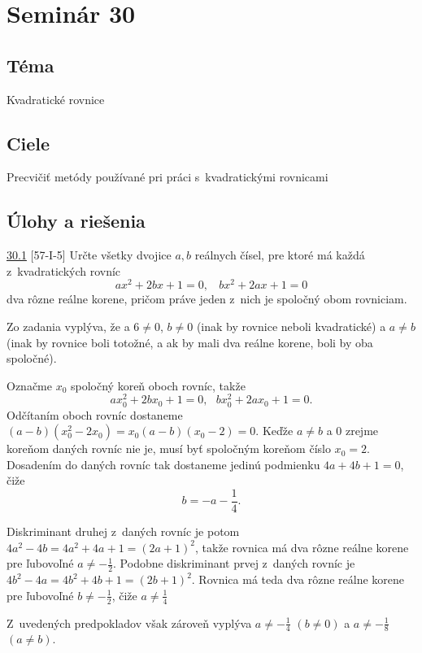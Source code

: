 \section*{Seminár 30}
\subsection*{Téma}
Kvadratické rovnice

\subsection*{Ciele}
Precvičiť metódy používané pri práci s~kvadratickými rovnicami

\subsection*{Úlohy a riešenia}
\begin{tcolorbox}[breakable,notitle,boxrule=0pt,colback=light-gray,colframe=light-gray]\ul{30.1} [57-I-5] Určte všetky dvojice $a, b$ reálnych čísel, pre ktoré má každá z~kvadratických rovníc
$$ax^2 + 2bx + 1 = 0, \ \ \ \ bx^2 + 2ax + 1 = 0$$
dva rôzne reálne korene, pričom práve jeden z~nich je spoločný obom rovniciam.

\end{tcolorbox}

\rieh Zo zadania vyplýva, že a $6\neq 0$, $b \neq 0$ (inak by rovnice neboli kvadratické)
a $a \neq b$ (inak by rovnice boli totožné, a ak by mali dva reálne korene, boli by oba
spoločné).

Označme $x_0$ spoločný koreň oboch rovníc, takže
$$ax_0^2+ 2bx_0 + 1 = 0,\ \ \ bx_0^2+ 2ax_0 + 1 = 0.$$
Odčítaním oboch rovníc dostaneme $(a - b)(x_0^2- 2x_0 ) = x_0 (a - b)(x_0 - 2) = 0$. Keďže $a \neq b$ a 0 zrejme koreňom daných rovníc nie je, musí byť spoločným koreňom číslo $x_0 = 2$. Dosadením do daných rovníc tak dostaneme jedinú podmienku $4a + 4b + 1 = 0$, čiže
$$b = -a -\frac{1}{4}.$$


Diskriminant druhej z~daných rovníc je potom $4a^2 - 4b = 4a^2 + 4a + 1 = (2a + 1)^2$, takže rovnica má dva rôzne reálne korene pre ľubovoľné $a \neq -\frac{1}{2}$. Podobne diskriminant prvej z~daných rovníc je $4b^2- 4a = 4b^2 + 4b +1 = (2b +1)^2$. Rovnica má teda dva rôzne reálne korene pre ľubovoľné $b \neq -\frac{1}{2}$, čiže $a\neq  \frac{1}{4}$

Z~uvedených predpokladov však zároveň vyplýva $a \neq -\frac{1}{4}$ $(b \neq 0)$ a $a \neq - \frac{1}{8}$ $(a \neq b)$.

